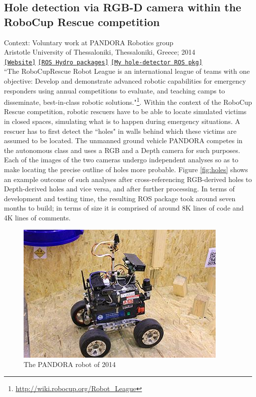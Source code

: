 \subsection{Hole detection via RGB-D camera within the RoboCup Rescue competition}

\noindent Context: Voluntary work at PANDORA Robotics group\\
\noindent Aristotle University of Thessaloniki, Thessaloniki, Greece; 2014\\

\noindent \href{http://pandora.ee.auth.gr/}{\texttt{[Website]}} \href{https://github.com/pandora-auth-ros-pkg}{\texttt{[ROS Hydro packages]}} \href{https://github.com/li9i/pandora_vision_2014/tree/hydro-devel/pandora_vision_hole_detector}{\texttt{[My hole-detector ROS pkg]}}\\


``The RoboCupRescue Robot League is an international league of teams with one
objective: Develop and demonstrate advanced robotic capabilities for emergency
responders using annual competitions to evaluate, and teaching camps to
disseminate, best-in-class robotic
solutions."\footnote{\url{http://wiki.robocup.org/Robot_League}}. Within the
context of the RoboCup Rescue competition, robotic rescuers have to be able to
locate simulated victims in closed spaces, simulating what is to happen during
emergency situations. A rescuer has to first detect the ``holes" in walls
behind which these victims are assumed to be located. The unmanned ground
vehicle PANDORA competes in the autonomous class and uses a RGB and a Depth
camera for such purposes. Each of the images of the two cameras undergo
independent analyses so as to make locating the precise outline of holes more
probable. Figure \ref{fig:holes} shows an example outcome of such analyses
after cross-referencing RGB-derived holes to Depth-derived holes and vice
versa, and after further processing. In terms of development and testing time,
the resulting ROS package took around seven months to build; in terms of size
it is comprised of around 8K lines of code and 4K lines of comments.

\begin{figure}[H]\centering
  \includegraphics[scale=1.5]{images/pandora_robot.jpg}
  \caption{\small The PANDORA robot of 2014}
  \label{fig:pandora_robot}
\end{figure}

